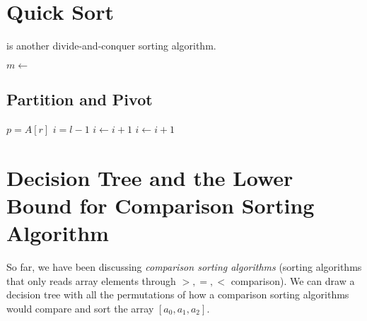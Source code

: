 \section{Quick Sort}

 is another divide-and-conquer sorting algorithm.

\noindent \hrulefill
\begin{algorithmic}[0]
   
      \State $m \gets$ 
      \State {}
      \State {}
    \EndIf
    \State {}
  \EndFunction
\end{algorithmic}
\noindent \hrulefill

\subsection{Partition and Pivot}

\noindent \hrulefill
\begin{algorithmic}[0]
   
    \State $p = A[r]$
    \State $i = l - 1$
        \State $i \gets i + 1$
        \State {}
      \EndIf
    \EndFor
    \State $i \gets i + 1$
    \State {}
    \State {}
  \EndFunction
\end{algorithmic}
\noindent \hrulefill

\section[Comparison Sorting Algo Lower Bound]{Decision Tree and the Lower Bound for Comparison Sorting Algorithm }

So far, we have been discussing \textit{comparison sorting algorithms} (sorting algorithms that only reads array elements through $>, =, <$ comparison). We can draw a decision tree with all the permutations of how a comparison sorting algorithms would compare and sort the array $[a_{0}, a_{1}, a_{2}]$.

\begin{center}
\end{center}


